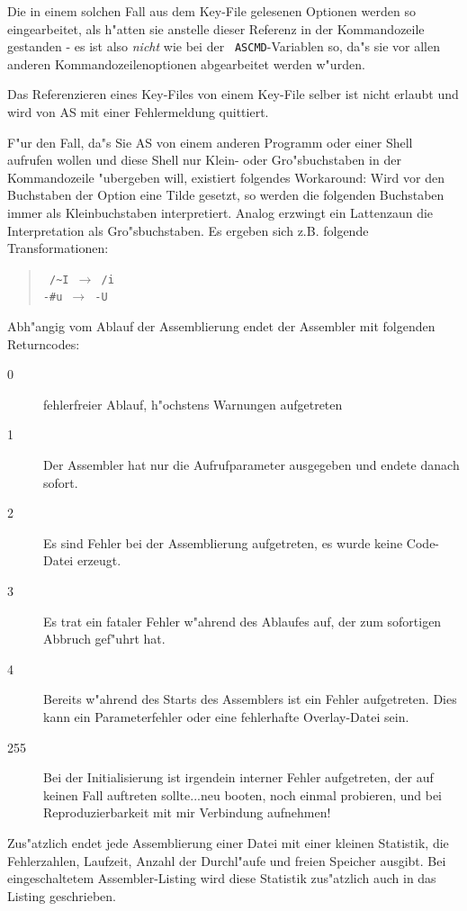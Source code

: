\documentclass[12pt,a4paper,twoside]{report}
\newcommand{\asname}{AS}
\begin{document}
Die in einem solchen Fall aus dem Key-File gelesenen Optionen werden so
eingearbeitet, als h"atten sie anstelle dieser Referenz in der
Kommandozeile gestanden - es ist also {\em nicht} wie bei der {\tt
ASCMD}-Variablen so, da"s sie vor allen anderen Kommandozeilenoptionen
abgearbeitet werden w"urden.
\par
Das Referenzieren eines Key-Files von einem Key-File selber ist nicht
erlaubt und wird von \asname{} mit einer Fehlermeldung quittiert.
\par
F"ur den Fall, da"s Sie \asname{} von einem anderen Programm oder einer Shell
aufrufen wollen und diese Shell nur Klein- oder Gro"sbuchstaben in der
Kommandozeile "ubergeben will, existiert folgendes Workaround: Wird vor
den Buchstaben der Option eine Tilde gesetzt, so werden die folgenden
Buchstaben immer als Kleinbuchstaben interpretiert.  Analog erzwingt
ein Lattenzaun die Interpretation als Gro"sbuchstaben.  Es ergeben
sich z.B. folgende Transformationen:
\begin{quote}{\tt
 /\verb!~!I $\longrightarrow$ /i \\
 -\verb!#!u $\longrightarrow$ -U}
\end{quote}
\par
Abh"angig vom Ablauf der Assemblierung endet der Assembler mit
folgenden Returncodes:
\begin{description}
\item[0]{fehlerfreier Ablauf, h"ochstens Warnungen aufgetreten}
\item[1]{Der Assembler hat nur die Aufrufparameter ausgegeben und
         endete danach sofort.}
\item[2]{Es sind Fehler bei der Assemblierung aufgetreten, es wurde
         keine Code-Datei erzeugt.}
\item[3]{Es trat ein fataler Fehler w"ahrend des Ablaufes auf, der
         zum sofortigen Abbruch gef"uhrt hat.}
\item[4]{Bereits w"ahrend des Starts des Assemblers ist ein Fehler
         aufgetreten.  Dies kann ein Parameterfehler oder eine fehlerhafte
         Overlay-Datei sein.}
\item[255]{Bei der Initialisierung ist irgendein interner Fehler
         aufgetreten, der auf keinen Fall auftreten sollte...neu booten,
         noch einmal probieren, und bei Reproduzierbarkeit mit mir
         Verbindung aufnehmen!}
\end{description}

Zus"atzlich endet jede Assemblierung einer Datei mit einer kleinen
Statistik, die Fehlerzahlen, Laufzeit, Anzahl der Durchl"aufe und freien
Speicher ausgibt.  Bei eingeschaltetem Assembler-Listing wird diese
Statistik zus"atzlich auch in das Listing geschrieben.
\end{document}
